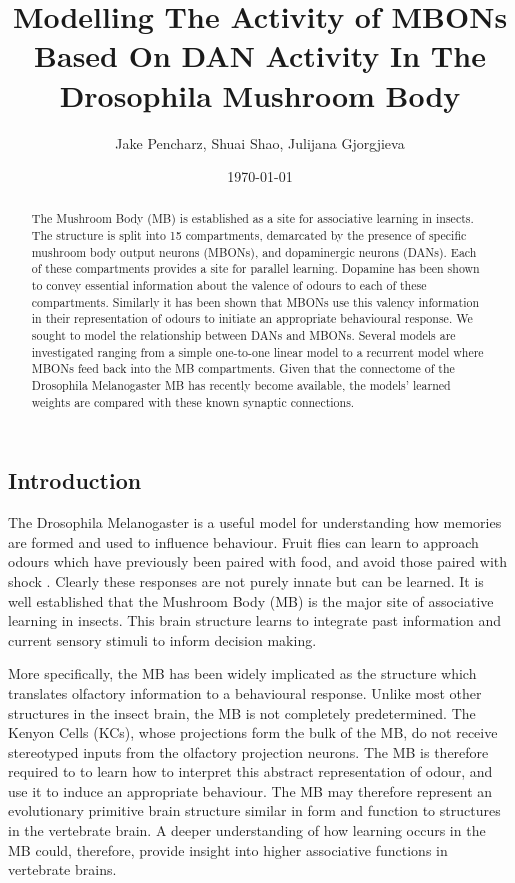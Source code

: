 \documentclass[11pt, A4]{article}
\title{Modelling The Activity of MBONs Based On DAN Activity In The Drosophila Mushroom Body}
\author{Jake Pencharz, Shuai Shao, Julijana Gjorgjieva}
\date{\monthyeardate \today}
\begin{document}
\raggedbottom
\raggedcolumns

\maketitle

\thispagestyle{fancy}
\begin{multicols}{2}


\begin{abstract}
The Mushroom Body (MB) is established as a site for associative learning in insects. The structure is split into 15 compartments, demarcated by the presence of specific mushroom body output neurons (MBONs), and dopaminergic neurons (DANs). Each of these compartments provides a site for parallel learning. Dopamine has been shown to convey essential information about the valence of odours to each of these compartments. Similarly it has been shown that MBONs use this valency information in their representation of odours to initiate an appropriate behavioural response. We sought to model the relationship between DANs and MBONs. Several models are investigated ranging from a simple one-to-one linear model to a recurrent model where MBONs feed back into the MB compartments. Given that the connectome of the Drosophila Melanogaster MB has recently become available, the models' learned weights are compared with these known synaptic connections. 
\end{abstract}

\section{Introduction}
The Drosophila Melanogaster is a useful model for understanding how memories are formed and used to influence behaviour. Fruit flies can learn to approach odours which have previously been paired with food, and avoid those paired with shock \cite{aso2014neuronal}. Clearly these responses are not purely innate but can be learned. It is well established that the Mushroom Body (MB) is the major site of associative learning in insects. This brain structure learns to integrate past information and current sensory stimuli to inform decision making. 

More specifically, the MB has been widely implicated as the structure which translates olfactory information to a behavioural response. Unlike most other structures in the insect brain, the MB  is not completely predetermined. The Kenyon Cells (KCs), whose projections form the bulk of the MB, do not receive stereotyped inputs from the olfactory projection neurons. The MB is therefore required to to learn how to interpret this abstract representation of odour, and use it to induce an appropriate behaviour. The MB may therefore represent an evolutionary primitive brain structure similar in form and function to structures in the vertebrate brain. A deeper understanding of how learning occurs in the MB could, therefore, provide insight into higher associative functions in vertebrate brains. 


\end{multicols}
\end{document}
